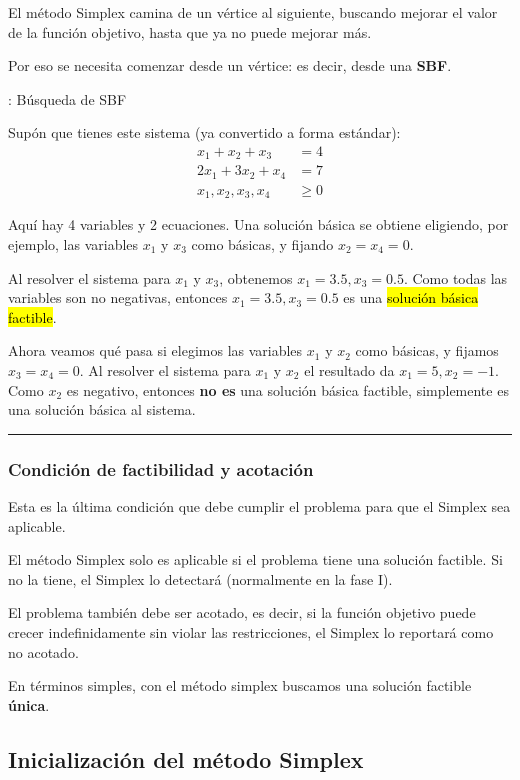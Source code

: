El método Simplex camina de un vértice al siguiente, buscando mejorar el valor de la función objetivo, hasta que ya no puede mejorar más.

Por eso se necesita comenzar desde un vértice: es decir, desde una \textbf{SBF}.

\ejemplo\label{ej:busqueda_sbf}{: Búsqueda de SBF}

Supón que tienes este sistema (ya convertido a forma estándar):
\begin{align*}
  x_1 + x_2 + x_3 &= 4 \\
  2x_1 + 3x_2 + x_4 &= 7 \\
  x_1, x_2, x_3, x_4 &\geq 0
 \end{align*}

Aquí hay 4 variables y 2 ecuaciones. Una solución básica se obtiene eligiendo, por ejemplo, las variables \(x_1\) y \(x_3\) como básicas, y fijando \(x_2 = x_4 = 0\).

Al resolver el sistema para \(x_1\) y \(x_3\), obtenemos \(x_1 = 3.5, x_3 = 0.5\). Como todas las variables son no negativas, entonces \(x_1 = 3.5, x_3 = 0.5\) es una \hl{solución básica factible}.

Ahora veamos qué pasa si elegimos las variables \(x_1\) y \(x_2\) como básicas, y fijamos \(x_3 = x_4 = 0\). Al resolver el sistema para \(x_1\) y \(x_2\) el resultado da \(x_1 = 5, x_2 = -1\). Como \(x_2\) es negativo, entonces \textbf{no es} una solución básica factible, simplemente es una solución básica al sistema.
\vspace{5mm}
\hrule

\subsubsection{Condición de factibilidad y acotación}

Esta es la última condición que debe cumplir el problema para que el Simplex sea aplicable.

El método Simplex solo es aplicable si el problema tiene una solución factible. Si no la tiene, el Simplex lo detectará (normalmente en la fase I).

El problema también debe ser acotado, es decir, si la función objetivo puede crecer indefinidamente sin violar las restricciones, el Simplex lo reportará como no acotado.

En términos simples, con el método simplex buscamos una solución factible \textbf{única}.

\subsection{Inicialización del método Simplex}

